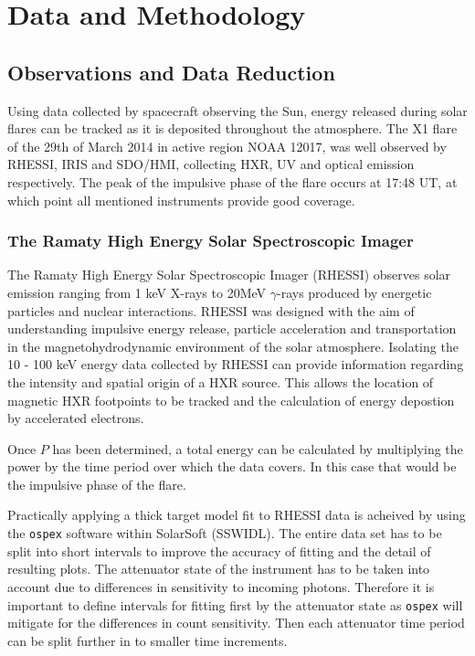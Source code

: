 \section{Data and Methodology}
\subsection{Observations and Data Reduction}
Using data collected by spacecraft observing the Sun, energy released during solar flares can be tracked as it is deposited throughout the atmosphere. The X1 flare of the 29th of March 2014 in active region NOAA 12017, was well observed by RHESSI, IRIS and SDO/HMI, collecting HXR, UV and optical emission respectively. The peak of the impulsive phase of the flare occurs at 17:48 UT, at which point all mentioned instruments provide good coverage. 

\subsubsection{The Ramaty High Energy Solar Spectroscopic Imager}
The Ramaty High Energy Solar Spectroscopic Imager (RHESSI) observes solar emission ranging from 1 keV X-rays to 20MeV $\gamma$-rays produced by energetic particles and nuclear interactions. RHESSI was designed with the aim of understanding impulsive energy release, particle acceleration and transportation in the magnetohydrodynamic environment of the solar atmosphere. Isolating the 10 - 100 keV energy data collected by RHESSI can provide information regarding the intensity and spatial origin of a HXR source. This allows the location of magnetic HXR footpoints to be tracked and the calculation of energy depostion by accelerated electrons. 

Once $P$ has been determined, a total energy can be calculated by multiplying the power by the time period over which the data covers. In this case that would be the impulsive phase of the flare.
  
Practically applying a thick target model fit to RHESSI data is acheived by using the \texttt{ospex} software within SolarSoft (SSWIDL). The entire data set has to be split into short intervals to improve the accuracy of fitting and the detail of resulting plots. The attenuator state of the instrument has to be taken into account due to differences in sensitivity to incoming photons. Therefore it is important to define intervals for fitting first by the attenuator state as \texttt{ospex} will mitigate for the differences in count sensitivity. Then each attenuator time period can be split further in to smaller time increments. 


